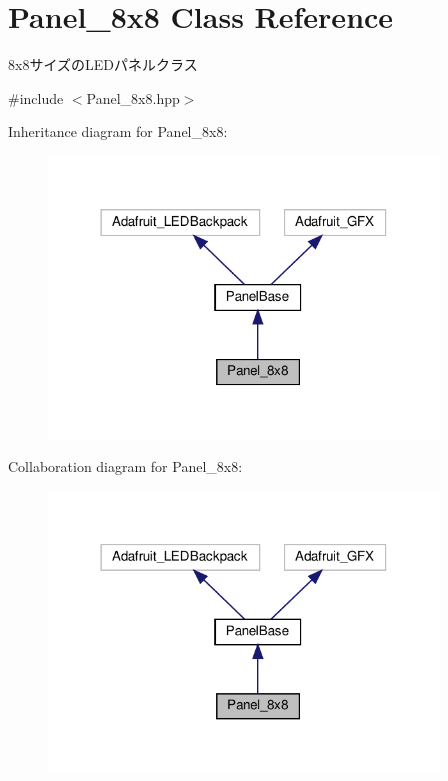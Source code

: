 \hypertarget{classPanel__8x8}{}\section{Panel\+\_\+8x8 Class Reference}
\label{classPanel__8x8}


8x8サイズの\+L\+E\+Dパネルクラス  




{\ttfamily \#include $<$Panel\+\_\+8x8.\+hpp$>$}



Inheritance diagram for Panel\+\_\+8x8\+:
\nopagebreak
\begin{figure}[H]
\begin{center}
\leavevmode
\includegraphics[width=294pt]{classPanel__8x8__inherit__graph}
\end{center}
\end{figure}


Collaboration diagram for Panel\+\_\+8x8\+:
\nopagebreak
\begin{figure}[H]
\begin{center}
\leavevmode
\includegraphics[width=294pt]{classPanel__8x8__coll__graph}
\end{center}
\end{figure}
